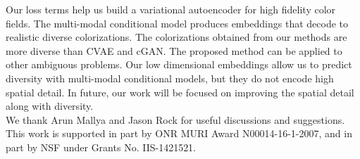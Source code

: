 \documentclass[10pt,twocolumn,letterpaper]{article}
\begin{document}
Our loss terms help us build a variational autoencoder for high fidelity color fields.
The multi-modal conditional model produces embeddings that decode to realistic 
diverse colorizations. The colorizations obtained from our methods are more
diverse than CVAE and cGAN. The proposed method can be applied to other ambiguous 
problems. Our low dimensional embeddings allow us to predict diversity with multi-modal 
conditional models, but they do not encode high spatial detail. In future, our work will 
be focused on improving the spatial detail along with diversity. \\ 

 We thank Arun Mallya and Jason Rock for useful 
discussions and suggestions. This work is supported in part by ONR MURI 
Award N00014-16-1-2007, and in part by NSF under Grants No.\NSF 
IIS-1421521.
\end{document}
